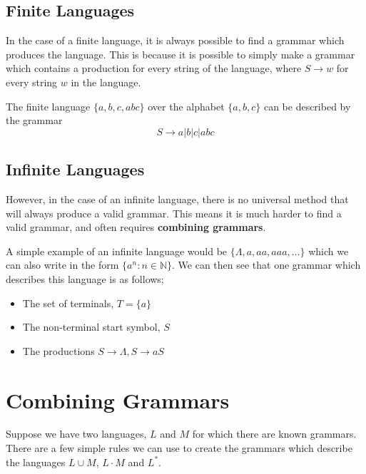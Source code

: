 \subsection*{Finite Languages}

In the case of a finite language, it is always possible to find a grammar which produces the language. This is because
 it is possible to simply make a grammar which contains a production for every string of the language, where
 $S \rightarrow w$ for every string $w$ in the language.

\begin{example*}{}{}
  The finite language $\{a, b, c, abc\}$ over the alphabet $\{a, b, c\}$ can be described by the grammar
  \begin{equation*}
    S \rightarrow a | b | c | abc
  \end{equation*}
\end{example*}

\subsection*{Infinite Languages}

However, in the case of an infinite language, there is no universal method that will always produce a valid grammar.
 This means it is much harder to find a valid grammar, and often requires \textbf{combining grammars}.

\begin{example*}{}{}
  A simple example of an infinite language would be $\{\Lambda, a, aa, aaa, \ldots\}$ which we can also write in the
   form $\{a^n : n \in \mathbb{N}\}$. We can then see that one grammar which describes this language is as follows;
  \begin{itemize}
    \item The set of terminals, $T = \{a\}$
    \item The non-terminal start symbol, $S$
    \item The productions $S \rightarrow \Lambda, S \rightarrow aS$
  \end{itemize}
\end{example*}

\section*{Combining Grammars}

Suppose we have two languages, $L$ and $M$ for which there are known grammars. There are a few simple rules we can use
 to create the grammars which describe the languages $L \cup M$, $L \cdot M$ and $L^*$.

